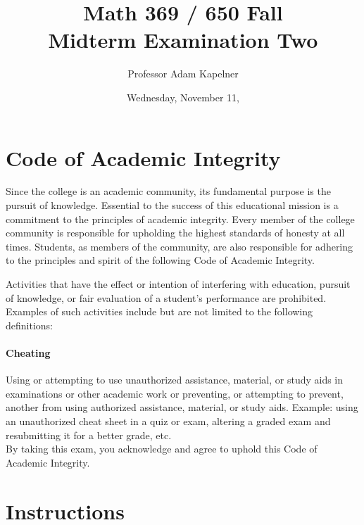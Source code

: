 \documentclass[12pt,landscape]{article}
\title{Math 369 / 650 Fall \the\year{} \\ Midterm Examination Two}
\author{Professor Adam Kapelner}
\date{Wednesday, November 11, \the\year{}}
\begin{document}
\maketitle


\thispagestyle{empty}

\section*{Code of Academic Integrity}

\footnotesize
Since the college is an academic community, its fundamental purpose is the pursuit of knowledge. Essential to the success of this educational mission is a commitment to the principles of academic integrity. Every member of the college community is responsible for upholding the highest standards of honesty at all times. Students, as members of the community, are also responsible for adhering to the principles and spirit of the following Code of Academic Integrity.

Activities that have the effect or intention of interfering with education, pursuit of knowledge, or fair evaluation of a student's performance are prohibited. Examples of such activities include but are not limited to the following definitions:

\paragraph{Cheating} Using or attempting to use unauthorized assistance, material, or study aids in examinations or other academic work or preventing, or attempting to prevent, another from using authorized assistance, material, or study aids. Example: using an unauthorized cheat sheet in a quiz or exam, altering a graded exam and resubmitting it for a better grade, etc.
\\

\noindent By taking this exam, you acknowledge and agree to uphold this Code of Academic Integrity. \\


\normalsize

\section*{Instructions}
\end{document}
